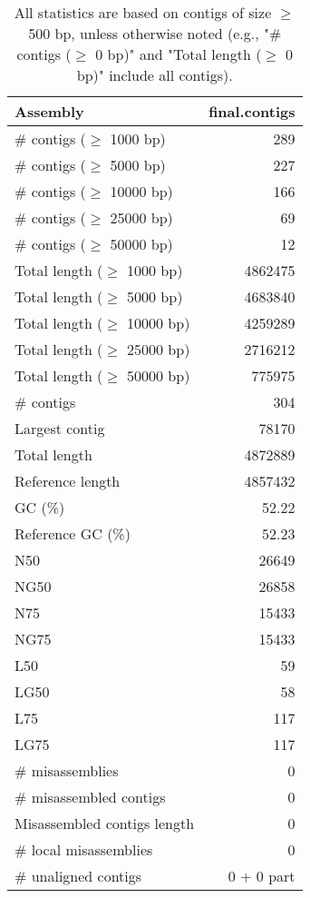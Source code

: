 \documentclass[12pt,a4paper]{article}
\begin{document}
\begin{table}[ht]
\begin{center}
\caption{All statistics are based on contigs of size $\geq$ 500 bp, unless otherwise noted (e.g., "\# contigs ($\geq$ 0 bp)" and "Total length ($\geq$ 0 bp)" include all contigs).}
\begin{tabular}{|l*{1}{|r}|}
\hline
Assembly & final.contigs \\ \hline
\# contigs ($\geq$ 1000 bp) & 289 \\ \hline
\# contigs ($\geq$ 5000 bp) & 227 \\ \hline
\# contigs ($\geq$ 10000 bp) & 166 \\ \hline
\# contigs ($\geq$ 25000 bp) & 69 \\ \hline
\# contigs ($\geq$ 50000 bp) & 12 \\ \hline
Total length ($\geq$ 1000 bp) & 4862475 \\ \hline
Total length ($\geq$ 5000 bp) & 4683840 \\ \hline
Total length ($\geq$ 10000 bp) & 4259289 \\ \hline
Total length ($\geq$ 25000 bp) & 2716212 \\ \hline
Total length ($\geq$ 50000 bp) & 775975 \\ \hline
\# contigs & 304 \\ \hline
Largest contig & 78170 \\ \hline
Total length & 4872889 \\ \hline
Reference length & 4857432 \\ \hline
GC (\%) & 52.22 \\ \hline
Reference GC (\%) & 52.23 \\ \hline
N50 & 26649 \\ \hline
NG50 & 26858 \\ \hline
N75 & 15433 \\ \hline
NG75 & 15433 \\ \hline
L50 & 59 \\ \hline
LG50 & 58 \\ \hline
L75 & 117 \\ \hline
LG75 & 117 \\ \hline
\# misassemblies & 0 \\ \hline
\# misassembled contigs & 0 \\ \hline
Misassembled contigs length & 0 \\ \hline
\# local misassemblies & 0 \\ \hline
\# unaligned contigs & 0 + 0 part \\ \hline

\end{tabular}
\end{center}
\end{table}
\end{document}
